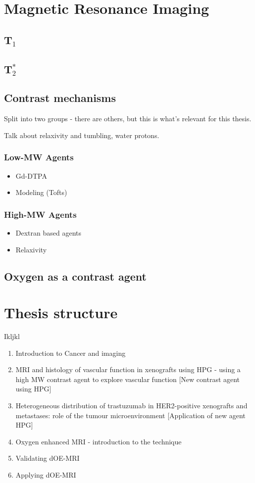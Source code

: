 \section{Magnetic Resonance Imaging}
\subsection{T$_1$}
\subsection{T$_2^*$}

\subsection{Contrast mechanisms}
Split into two groups - there are others, but this is what's relevant for this thesis.

Talk about relaxivity and tumbling, water protons.

\subsubsection{Low-MW Agents}
\begin{itemize}
\item Gd-DTPA
\item Modeling (Tofts)
\end{itemize}

\subsubsection{High-MW Agents}
\begin{itemize}
\item Dextran based agents
\item Relaxivity
\end{itemize}

\subsection{Oxygen as a contrast agent}

\section{Thesis structure}
Ikljkl
\begin{enumerate}
\item Introduction to Cancer and imaging
\item MRI and histology of vascular function in xenografts using HPG - using a high MW contrast agent to explore vascular function [New contrast agent using HPG] 
\item Heterogeneous distribution of trastuzumab in HER2-positive xenografts and metastases: role of the tumour microenvironment [Application of new agent HPG]
\item Oxygen enhanced MRI - introduction to the technique
\item Validating dOE-MRI
\item Applying dOE-MRI
\end{enumerate}
